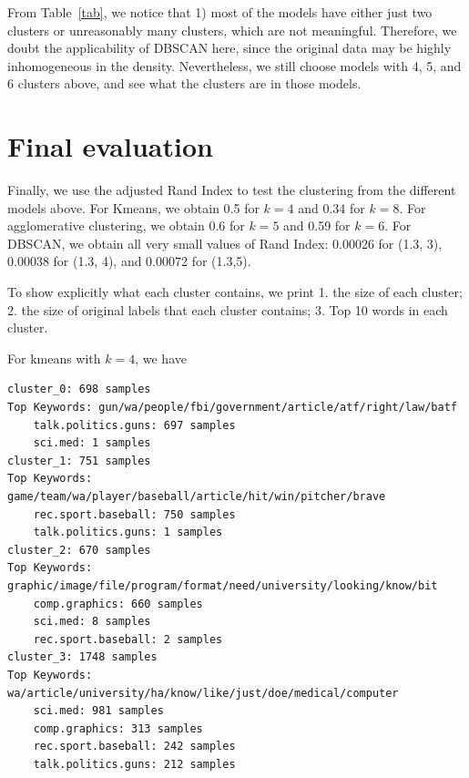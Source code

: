\documentclass{article}
\begin{document}
        From Table~\ref{tab}, we notice that 1) most of the models have either just two clusters or unreasonably many clusters, which are not meaningful. Therefore, we doubt the applicability of DBSCAN here, since the original data may be highly inhomogeneous in the density. Nevertheless, we still choose models with 4, 5, and 6 clusters above, and see what the clusters are in those models.

    \section{Final evaluation}

    Finally, we use the adjusted Rand Index to test the clustering from the different models above. For Kmeans, we obtain 0.5 for $k=4$ and 0.34 for $k=8$. For agglomerative clustering, we obtain  0.6 for $k=5$ and 0.59 for $k=6$. For DBSCAN, we obtain all very small values of Rand Index: 0.00026 for (1.3, 3), 0.00038 for (1.3, 4), and 0.00072 for (1.3,5). 

    To show explicitly what each cluster contains, we print 1. the size of each cluster; 2. the size of original labels that each cluster contains; 3. Top 10 words in each cluster. 

    For kmeans with $k=4$, we have 
    \begin{Verbatim}
cluster_0: 698 samples
Top Keywords: gun/wa/people/fbi/government/article/atf/right/law/batf
	talk.politics.guns: 697 samples
	sci.med: 1 samples
cluster_1: 751 samples
Top Keywords: game/team/wa/player/baseball/article/hit/win/pitcher/brave
	rec.sport.baseball: 750 samples
	talk.politics.guns: 1 samples
cluster_2: 670 samples
Top Keywords: graphic/image/file/program/format/need/university/looking/know/bit
	comp.graphics: 660 samples
	sci.med: 8 samples
	rec.sport.baseball: 2 samples
cluster_3: 1748 samples
Top Keywords: wa/article/university/ha/know/like/just/doe/medical/computer
	sci.med: 981 samples
	comp.graphics: 313 samples
	rec.sport.baseball: 242 samples
	talk.politics.guns: 212 samples
    \end{Verbatim}
\end{document}
